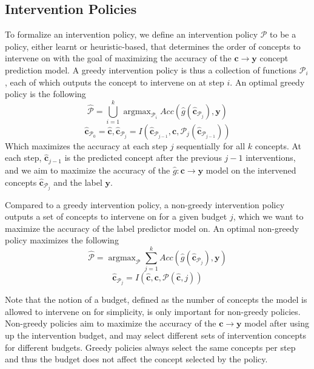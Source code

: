 \subsection{Intervention Policies}

To formalize an intervention policy, we define an intervention policy $\mathcal{P}$ 
to be a policy, either learnt
or heuristic-based, that determines the order of concepts to intervene 
on with the goal of maximizing the accuracy of the $\mathbf{c} \to \mathbf{y}$ concept prediction model.
A greedy intervention policy is thus a collection of functions $\mathcal{P}_i$, each
of which outputs the concept to intervene on at step $i$. An optimal greedy policy is the following
\[\hat{\mathcal{P}} = \bigcup_{i=1}^k \mathop{\mathrm{argmax}}_{\mathcal{P}_i} Acc(\hat{g}(\hat{\mathbf{c}}_{\mathcal{P}_j}), \mathbf{y}) \]
\[\hat{\mathbf{c}}_{\mathcal{P}_0} = \hat{\mathbf{c}}, \hat{\mathbf{c}}_{\mathcal{P}_j} = I(\hat{\mathbf{c}}_{\mathcal{P}_{j-1}}, \mathbf{c}, \mathcal{P}_j(\hat{\mathbf{c}}_{\mathcal{P}_{j-1}}))\]
Which maximizes the accuracy at each step $j$ sequentially
for all $k$ concepts. At each
step, $\hat{\mathbf{c}}_{j-1}$ is 
the predicted concept after the previous $j-1$ interventions,
and we aim to maximize the accuracy of the $\hat{g}: \mathbf{c} \to \mathbf{y}$ model
on the intervened concepts $\hat{\mathbf{c}}_{\mathcal{P}_j}$ and the label $\mathbf{y}$.


Compared to a greedy intervention policy, a non-greedy intervention 
policy outputs a set of concepts to intervene on for a given budget $j$,
which we want to maximize the accuracy of the 
label predictor model on. An optimal non-greedy policy maximizes the following
\[\hat{\mathcal{P}} = \mathop{\mathrm{argmax}}_{\mathcal{P}} \sum_{j=1}^k Acc(\hat{g}(\hat{\mathbf{c}}_{\mathcal{P}_j}), \mathbf{y}) \]
\[\hat{\mathbf{c}}_{\mathcal{P}_j} = I(\hat{\mathbf{c}}, \mathbf{c}, \mathcal{P}(\hat{\mathbf{c}}, j))\]

Note that the notion of a budget, defined as the number
of concepts the model is allowed to intervene on for simplicity, is only
important for non-greedy policies. Non-greedy policies aim
to maximize the accuracy of the $\mathbf{c} \to \mathbf{y}$ model after using up the intervention budget,
and may select different sets of intervention concepts 
for different budgets. Greedy policies always select the same
concepts per step and thus the budget does not 
affect the concept selected by the policy.

